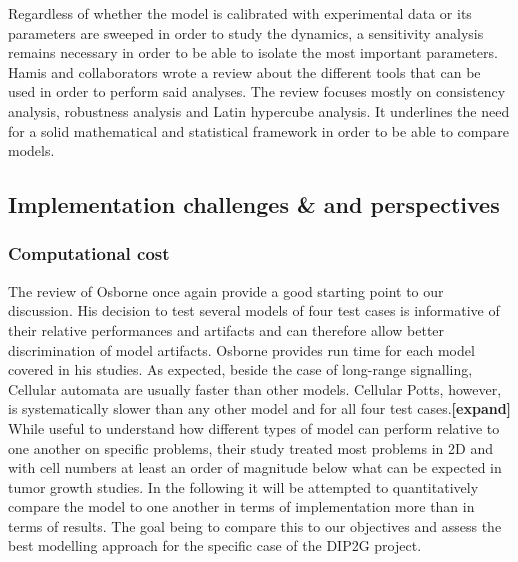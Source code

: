 \documentclass[11pt,a4paper]{article}
\begin{document}
Regardless of whether the model is calibrated with experimental data or its parameters are sweeped in order to study the dynamics, a sensitivity analysis remains necessary in order to be able to isolate the most important parameters. Hamis and collaborators wrote a review about the different tools that can be used in order to perform said analyses. \cite{Hamis2020b} The review focuses mostly on consistency analysis, robustness analysis and Latin hypercube analysis. It underlines the need for a solid mathematical and statistical framework in order to be able to compare models.


\subsection{Implementation challenges \& and perspectives}

\subsubsection{Computational cost}
The review of Osborne once again provide a good starting point to our discussion. His decision to test several models of four test cases is informative of their relative performances and artifacts and can therefore allow better discrimination of model artifacts. Osborne provides run time for each model covered in his studies. As expected, beside the case of long-range signalling, Cellular automata are usually faster than other models. Cellular Potts, however, is systematically slower than any other model and for all four test cases.\textbf{[expand]} While useful to understand how different types of model can perform relative to one another on specific problems, their study treated most problems in 2D and with cell numbers at least an order of magnitude below what can be expected in tumor growth studies. In the following it will be attempted to quantitatively compare the model to one another in terms of implementation more than in terms of results. The goal being to compare this to our objectives and assess the best modelling approach for the specific case of the DIP2G project.
\end{document}
